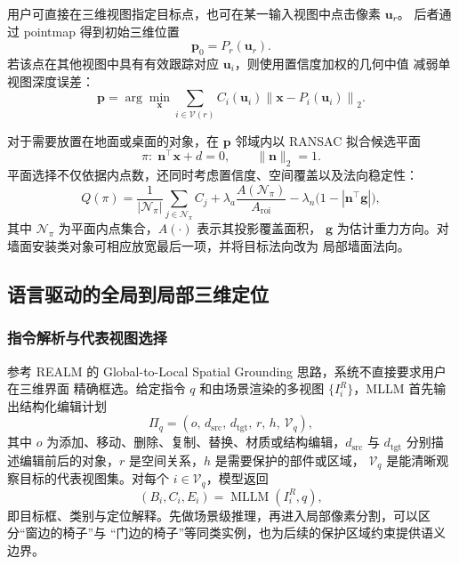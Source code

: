 用户可直接在三维视图指定目标点，也可在某一输入视图中点击像素 $\mathbf{u}_r$。
后者通过 pointmap 得到初始三维位置
\begin{equation}
  \mathbf{p}_0=P_r(\mathbf{u}_r).
\end{equation}
若该点在其他视图中具有有效跟踪对应 $\mathbf{u}_{i}$，则使用置信度加权的几何中值
减弱单视图深度误差：
\begin{equation}
  \mathbf{p}
  =\arg\min_{\mathbf{x}}
  \sum_{i\in\mathcal{V}(r)}
  C_i(\mathbf{u}_i)\left\|\mathbf{x}-P_i(\mathbf{u}_i)\right\|_2.
\end{equation}

对于需要放置在地面或桌面的对象，在 $\mathbf{p}$ 邻域内以 RANSAC 拟合候选平面
\begin{equation}
  \pi:\;\mathbf{n}^{\top}\mathbf{x}+d=0,
  \qquad \|\mathbf{n}\|_2=1.
\end{equation}
平面选择不仅依据内点数，还同时考虑置信度、空间覆盖以及法向稳定性：
\begin{equation}
  Q(\pi)=
  \frac{1}{|\mathcal{N}_{\pi}|}
  \sum_{j\in\mathcal{N}_{\pi}}C_j
  +\lambda_{a}\frac{A(\mathcal{N}_{\pi})}{A_{\mathrm{roi}}}
  -\lambda_{n}\big(1-|\mathbf{n}^{\top}\mathbf{g}|\big),
\end{equation}
其中 $\mathcal{N}_{\pi}$ 为平面内点集合，$A(\cdot)$ 表示其投影覆盖面积，
$\mathbf{g}$ 为估计重力方向。对墙面安装类对象可相应放宽最后一项，并将目标法向改为
局部墙面法向。

\subsection{语言驱动的全局到局部三维定位}

\subsubsection{指令解析与代表视图选择}

参考 REALM 的 Global-to-Local Spatial Grounding 思路\cite{realm}，系统不直接要求用户在三维界面
精确框选。给定指令 $q$ 和由场景渲染的多视图 $\{I_i^R\}$，MLLM 首先输出结构化编辑计划
\begin{equation}
  \Pi_q=(o,\,d_{\mathrm{src}},\,d_{\mathrm{tgt}},\,r,\,h,\,\mathcal{V}_q),
\end{equation}
其中 $o$ 为添加、移动、删除、复制、替换、材质或结构编辑，$d_{\mathrm{src}}$ 与
$d_{\mathrm{tgt}}$ 分别描述编辑前后的对象，$r$ 是空间关系，$h$ 是需要保护的部件或区域，
$\mathcal{V}_q$ 是能清晰观察目标的代表视图集。对每个 $i\in\mathcal{V}_q$，模型返回
\begin{equation}
  (B_i,C_i,E_i)=\operatorname{MLLM}(I_i^R,q),
\end{equation}
即目标框、类别与定位解释。先做场景级推理，再进入局部像素分割，可以区分“窗边的椅子”与
“门边的椅子”等同类实例，也为后续的保护区域约束提供语义边界。

